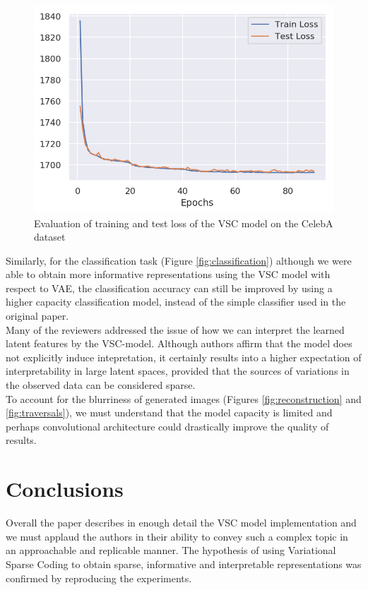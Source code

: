 \begin{figure}[h]
    \centering
    \captionsetup{justification=centering,margin=1.3cm}
    \includegraphics[width=.55\textwidth]{figures/CelebA_Loss}
    \centering
    \caption{Evaluation of training and test loss of the VSC model on the CelebA dataset}
    \label{fig:CelebALoss}
\end{figure}

Similarly, for the classification task (Figure \ref{fig:classification}) although we were able to obtain more informative representations using the VSC model with respect to VAE, the classification accuracy can still be improved by using a higher capacity classification model, instead of the simple classifier used in the original paper. \\

Many of the reviewers addressed the issue of how we can interpret the  learned latent features by the VSC-model. Although authors affirm that the model does not explicitly induce intepretation, it certainly results into a higher expectation of interpretability in large latent spaces, provided that the sources of variations in the observed data can be considered sparse. \\

To account for the blurriness of generated images (Figures \ref{fig:reconstruction} and \ref{fig:traversals}), we must understand that the model capacity is limited and perhaps convolutional architecture could drastically improve the quality of results. 

\section{Conclusions}
\label{conclusions}

Overall the paper describes in enough detail the VSC model implementation and we must applaud the authors in their ability to convey such a complex topic in an approachable and replicable manner. The hypothesis of using Variational Sparse Coding to obtain sparse, informative and interpretable representations was confirmed by reproducing the experiments. \\

